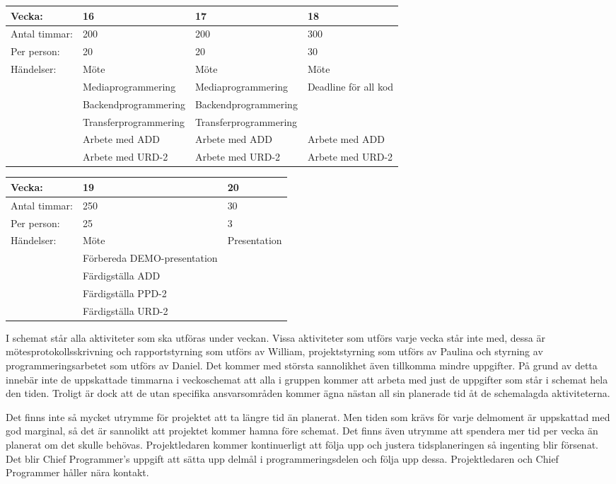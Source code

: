\begin{tabular}{ | p{65pt} || p{110pt} | p{110pt} | p{110pt} |}
  \hline
  Vecka: & 16 & 17 & 18  \\ \hline
  Antal timmar: & 200 & 200 & 300 \\ \hline
  Per person: & 20 & 20 & 30 \\ \hline
  Händelser: & Möte & Möte & Möte \\ \hline
  & Mediaprogrammering & Mediaprogrammering & Deadline för all kod \\ \hline
  & Backendprogrammering & Backendprogrammering &  \\ \hline
  & Transferprogrammering & Transferprogrammering &  \\ \hline
  & Arbete med ADD & Arbete med ADD & Arbete med ADD \\ \hline
  & Arbete med URD-2 & Arbete med URD-2 & Arbete med URD-2\\ \hline
\end{tabular}

\begin{tabular}{ | p{65pt} || p{110pt} | p{233pt} |}
  \hline
  Vecka: & 19 & 20 \\ \hline
  Antal timmar: & 250 & 30 \\ \hline
  Per person: & 25 & 3 \\ \hline
  Händelser: & Möte & Presentation\\ \hline
  & Förbereda DEMO-presentation &\\ \hline
  & Färdigställa ADD &\\ \hline
  & Färdigställa PPD-2 &\\ \hline
  & Färdigställa URD-2 &\\ \hline
\end{tabular}

I schemat står alla aktiviteter som ska utföras under veckan. Vissa aktiviteter som utförs varje vecka står inte med, dessa är mötesprotokollsskrivning och rapportstyrning som utförs av William, projektstyrning som utförs av Paulina och styrning av programmeringsarbetet som utförs av Daniel. Det kommer med största sannolikhet även tillkomma mindre uppgifter. På grund av detta innebär inte de uppskattade timmarna i veckoschemat att alla i gruppen kommer att arbeta med just de uppgifter som står i schemat hela den tiden. Troligt är dock att de utan specifika ansvarsområden kommer ägna nästan all sin planerade tid åt de schemalagda aktiviteterna. 

Det finns inte så mycket utrymme för projektet att ta längre tid än planerat. Men tiden som krävs för varje delmoment är uppskattad med god marginal, så det är sannolikt att projektet kommer hamna före schemat. Det finns även utrymme att spendera mer tid per vecka än planerat om det skulle behövas. Projektledaren kommer kontinuerligt att följa upp och justera tidsplaneringen så ingenting blir försenat. Det blir Chief Programmer’s uppgift att sätta upp delmål i programmeringsdelen och följa upp dessa. Projektledaren och Chief Programmer håller nära kontakt.
